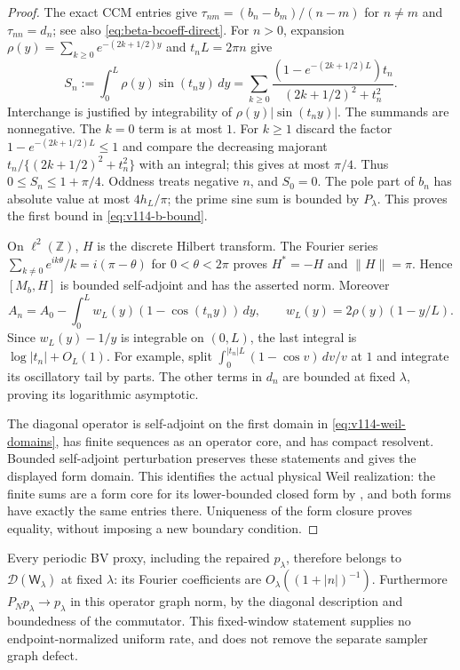 \documentclass[11pt]{article}
\theoremstyle{remark}
\begin{document}
\begin{proof}
The exact CCM entries give $\tau_{nm}=(b_n-b_m)/(n-m)$ for $n\ne m$
and $\tau_{nn}=d_n$; see also \eqref{eq:beta-bcoeff-direct}.
For $n>0$, expansion $\rho(y)=\sum_{k\ge0}e^{-(2k+1/2)y}$ and
$t_nL=2\pi n$ give
\[
 S_n:=\int_0^L\rho(y)\sin(t_ny)\,dy
 =\sum_{k\ge0}\frac{(1-e^{-(2k+1/2)L})t_n}
                         {(2k+1/2)^2+t_n^2}.
\]
Interchange is justified by integrability of
$\rho(y)|\sin(t_ny)|$. The summands are nonnegative. The $k=0$
term is at most $1$. For $k\ge1$ discard the factor
$1-e^{-(2k+1/2)L}\le1$ and compare the decreasing majorant
$t_n/\{(2k+1/2)^2+t_n^2\}$ with an integral; this gives at most
$\pi/4$. Thus
$0\le S_n\le1+\pi/4$. Oddness treats negative $n$, and $S_0=0$.
The pole part of $b_n$ has absolute value at most $4h_L/\pi$;
the prime sine sum is bounded by $P_\lambda$. This proves the first
bound in \eqref{eq:v114-b-bound}.

On $\ell^2(\mathbb Z)$, $H$ is the discrete Hilbert transform.
The Fourier series $\sum_{k\ne0}e^{ik\theta}/k=i(\pi-\theta)$
for $0<\theta<2\pi$ proves $H^*=-H$ and $\|H\|=\pi$.
Hence $[M_b,H]$ is bounded self-adjoint and has the asserted norm.
Moreover
\[
 A_n=A_0-\int_0^L w_L(y)(1-\cos(t_ny))\,dy,
 \qquad w_L(y)=2\rho(y)(1-y/L).
\]
Since $w_L(y)-1/y$ is integrable on $(0,L)$, the last integral is
$\log|t_n|+O_L(1)$. For example, split
$\int_0^{|t_n|L}(1-\cos v)\,dv/v$ at $1$ and integrate its
oscillatory tail by parts. The other terms in $d_n$ are bounded at
fixed $\lambda$, proving its logarithmic asymptotic.

The diagonal operator is self-adjoint on the first domain in
\eqref{eq:v114-weil-domains}, has finite sequences as an operator
core, and has compact resolvent. Bounded self-adjoint perturbation
preserves these statements and gives the displayed form domain.
This identifies the actual physical Weil realization: the finite sums
are a form core for its lower-bounded closed form by
\cite[Propositions~3.2--3.4]{ConnesConsaniMoscovici2025}, and both
forms have exactly the same entries there. Uniqueness of the form
closure proves equality, without imposing a new boundary condition.
\end{proof}

Every periodic BV proxy, including the repaired $p_\lambda$, therefore
belongs to $\mathcal D(\mathsf W_\lambda)$ at fixed $\lambda$:
its Fourier coefficients are $O_\lambda((1+|n|)^{-1})$.
Furthermore $P_Np_\lambda\to p_\lambda$ in this operator graph norm,
by the diagonal description and boundedness of the commutator. This
fixed-window statement supplies no endpoint-normalized uniform rate,
and does not remove the separate sampler graph defect.
\end{document}
